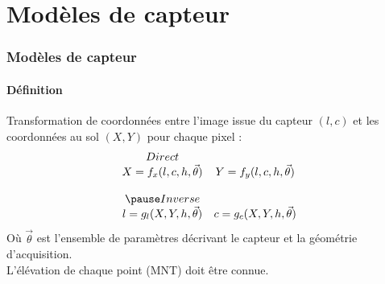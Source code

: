 \documentclass[compress,handout]{beamer}
\begin{document}


\section[Modèles]{Modèles de capteur}


\begin{frame}
  \frametitle{Modèles de capteur}

  \framesubtitle{Définition}
Transformation de coordonnées entre l'image issue du capteur $(l,c)$
et les coordonnées au sol $(X,Y)$ pour chaque pixel :
\pause
\begin{displaymath}
  \begin{array}{cc}
    Direct & \\
    X = f_x(l,c,h,\vec\theta) & Y = f_y(l,c,h,\vec\theta)\\
     & \\ \pause
    Inverse & \\
    l = g_l(X,Y,h,\vec\theta) & c = g_c(X,Y,h,\vec\theta)
  \end{array}
\end{displaymath}
\pause
Où $\vec\theta$ est l'ensemble de paramètres décrivant le capteur et
la géométrie d'acquisition.\\
\pause
L'élévation de chaque point (MNT) doit être connue.
  
\end{frame}
\end{document}
